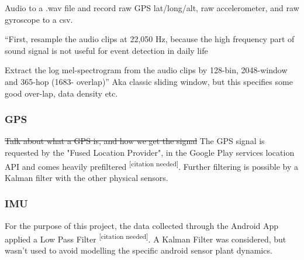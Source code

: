 \documentclass{UoNMCHA}
\newcommand{\citationneeded}{\textsuperscript{\color{blue} [citation needed]}}
\numberwithin{equation}{section}
\begin{document}



Audio to a .wav file and record raw GPS lat/long/alt, raw accelerometer, and raw gyroscope to a csv.  

“First, resample the audio clips at 22,050 Hz, because the high frequency part of sound signal is not useful for event detection in daily life

Extract the log mel-spectrogram from the audio clips by 128-bin, 2048-window and 365-hop (1683- overlap)”
Aka classic sliding window, but this specifies some good over-lap, data density etc.

\subsubsection{GPS}
\sout{Talk about what a GPS is, and how we get the signal}
The GPS signal is requested by the "Fused Location Provider", in the Google Play services location API and comes heavily prefiltered\citationneeded. Further filtering is possible by a Kalman filter with the other physical sensors.

\subsubsection{IMU}
For the purpose of this project, the data collected through the Android App applied a Low Pass Filter\citationneeded. A Kalman Filter was considered, but wasn't used to avoid modelling the specific android sensor plant dynamics.
\end{document}
